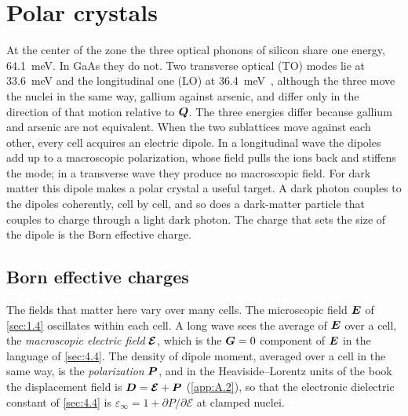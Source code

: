 \section{Polar crystals}\label{sec:5.5}

At the center of the zone the three optical phonons of silicon share one energy, \SI{64.1}{meV}. In GaAs they do not. Two transverse optical (TO) modes lie at \SI{33.6}{meV} and the longitudinal one (LO) at \SI{36.4}{meV}~\cite{strauch1990phonon}, although the three move the nuclei in the same way, gallium against arsenic, and differ only in the direction of that motion relative to $\bm{Q}$. The three energies differ because gallium and arsenic are not equivalent. When the two sublattices move against each other, every cell acquires an electric dipole. In a longitudinal wave the dipoles add up to a macroscopic polarization, whose field pulls the ions back and stiffens the mode; in a transverse wave they produce no macroscopic field. For dark matter this dipole makes a polar crystal a useful target. A dark photon couples to the dipoles coherently, cell by cell, and so does a dark-matter particle that couples to charge through a light dark photon. The charge that sets the size of the dipole is the Born effective charge.

\subsection{Born effective charges}

The fields that matter here vary over many cells. The microscopic field $\bm{E}$ of \cref{sec:1.4} oscillates within each cell. A long wave sees the average of $\bm{E}$ over a cell, the \emph{macroscopic electric field} $\bm{\mathcal{E}}$, which is the $\bm{G} = 0$ component of $\bm{E}$ in the language of \cref{sec:4.4}. The density of dipole moment, averaged over a cell in the same way, is the \emph{polarization} $\bm{P}$, and in the Heaviside--Lorentz units of the book the displacement field is $\bm{D} = \bm{\mathcal{E}} + \bm{P}$ (\cref{app:A.2}), so that the electronic dielectric constant of \cref{sec:4.4} is $\varepsilon_\infty = 1 + \partial P/\partial\mathcal{E}$ at clamped nuclei.

